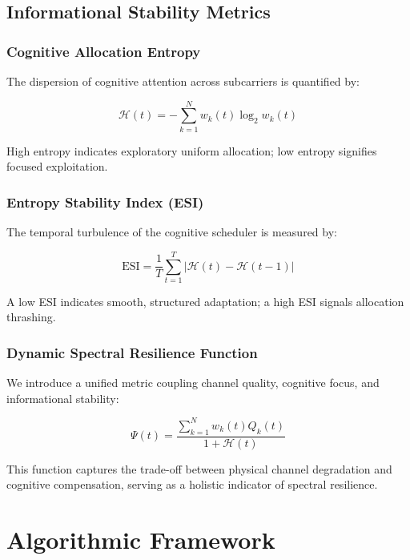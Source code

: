 \documentclass[journal,10pt,twocolumn,twoside]{IEEEtran}
\begin{document}
\subsection{Informational Stability Metrics}

\subsubsection{Cognitive Allocation Entropy}

The dispersion of cognitive attention across subcarriers is quantified by:

\begin{equation}
\mathcal{H}(t) = -\sum_{k=1}^{N} w_k(t) \log_2 w_k(t)
\label{eq:entropy}
\end{equation}

High entropy indicates exploratory uniform allocation; low entropy signifies focused exploitation.

\subsubsection{Entropy Stability Index (ESI)}

The temporal turbulence of the cognitive scheduler is measured by:

\begin{equation}
\text{ESI} = \frac{1}{T} \sum_{t=1}^{T} |\mathcal{H}(t) - \mathcal{H}(t-1)|
\label{eq:esi}
\end{equation}

A low ESI indicates smooth, structured adaptation; a high ESI signals allocation thrashing.

\subsubsection{Dynamic Spectral Resilience Function}

We introduce a unified metric coupling channel quality, cognitive focus, and informational stability:

\begin{equation}
\Psi(t) = \frac{\sum_{k=1}^{N} w_k(t) Q_k(t)}{1 + \mathcal{H}(t)}
\label{eq:psi}
\end{equation}

This function captures the trade-off between physical channel degradation and cognitive compensation, serving as a holistic indicator of spectral resilience.

\section{Algorithmic Framework}
\label{sec:algorithm}
\end{document}
